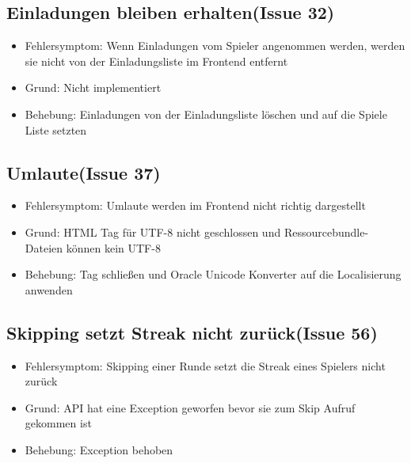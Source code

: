 \documentclass[a4paper]{scrreprt}
\begin{document}
    \subsection{Einladungen bleiben erhalten(Issue 32)}
    \begin{itemize}
        \item Fehlersymptom: Wenn Einladungen vom Spieler angenommen werden, werden sie nicht von der Einladungsliste im Frontend entfernt
        \item Grund: Nicht implementiert
        \item Behebung: Einladungen von der Einladungsliste löschen und auf die Spiele Liste setzten
    \end{itemize}
    \subsection{Umlaute(Issue 37)}
    \begin{itemize}
        \item Fehlersymptom: Umlaute werden im Frontend nicht richtig dargestellt
        \item Grund: HTML Tag für UTF-8 nicht geschlossen und Ressourcebundle-Dateien können kein UTF-8 
        \item Behebung: Tag schließen und Oracle Unicode Konverter auf die Localisierung anwenden
    \end{itemize}
    \subsection{Skipping setzt Streak nicht zurück(Issue 56)}
    \begin{itemize}
        \item Fehlersymptom: Skipping einer Runde setzt die Streak eines Spielers nicht zurück
        \item Grund: API hat eine Exception geworfen bevor sie zum Skip Aufruf gekommen ist
        \item Behebung: Exception behoben
    \end{itemize}
\end{document}
